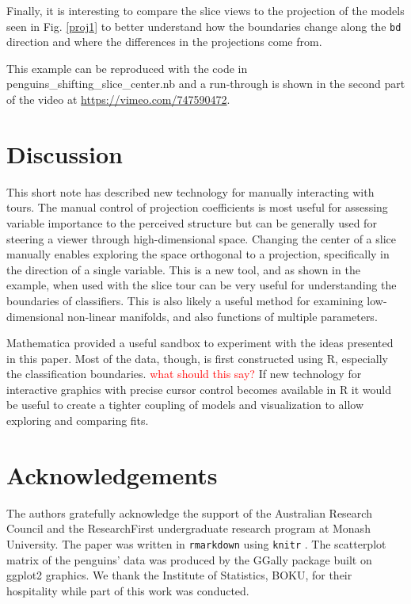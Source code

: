\documentclass[]{interact}
\theoremstyle{plain}%
\theoremstyle{definition}
\theoremstyle{remark}
\begin{document}
Finally, it is interesting to compare the slice views to the projection
of the models seen in Fig. \ref{proj1} to better understand how the
boundaries change along the \texttt{bd} direction and where the
differences in the projections come from.

This example can be reproduced with the code in
penguins\_shifting\_slice\_center.nb and a run-through is shown in the
second part of the video at \url{https://vimeo.com/747590472}.

\hypertarget{sec:discussion}{%
\section{Discussion}\label{sec:discussion}}

This short note has described new technology for manually interacting
with tours. The manual control of projection coefficients is most useful
for assessing variable importance to the perceived structure but can be
generally used for steering a viewer through high-dimensional space.
Changing the center of a slice manually enables exploring the space
orthogonal to a projection, specifically in the direction of a single
variable. This is a new tool, and as shown in the example, when used
with the slice tour can be very useful for understanding the boundaries
of classifiers. This is also likely a useful method for examining
low-dimensional non-linear manifolds, and also functions of multiple
parameters.

Mathematica provided a useful sandbox to experiment with the ideas
presented in this paper. Most of the data, though, is first constructed
using R, especially the classification boundaries.
\textcolor{red}{what should this say?} If new technology for interactive
graphics with precise cursor control becomes available in R it would be
useful to create a tighter coupling of models and visualization to allow
exploring and comparing fits.

\hypertarget{acknowledgements}{%
\section*{Acknowledgements}\label{acknowledgements}}

The authors gratefully acknowledge the support of the Australian
Research Council and the ResearchFirst undergraduate research program at
Monash University. The paper was written in \texttt{rmarkdown}
\citep{rmarkdown} using \texttt{knitr} \citep{knitr}. The scatterplot
matrix of the penguins' data was produced by the GGally \citep{GGally}
package built on ggplot2 \citep{ggplot2} graphics. We thank the
Institute of Statistics, BOKU, for their hospitality while part of this
work was conducted.
\end{document}
